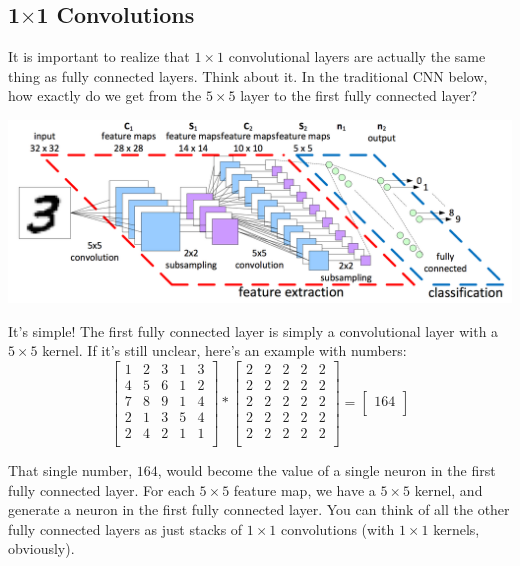 \documentclass{article}
\begin{document}
\subsection{1$\times$1 Convolutions}

It is important to realize that $1\times1$ convolutional layers are actually the same thing as fully connected layers. Think about it. In the traditional CNN below, how exactly do we get from the $5\times5$ layer to the first fully connected layer?

\begin{center}
\includegraphics[scale=0.45]{standardconv.png}
\end{center}

It's simple! The first fully connected layer is simply a convolutional layer with a $5\times5$ kernel. If it's still unclear, here's an example with numbers:
\[
\begin{bmatrix}
  1 & 2 & 3 & 1 & 3\\
  4 & 5 & 6 & 1 & 2\\
  7 & 8 & 9 & 1 & 4\\
  2 & 1 & 3 & 5 & 4\\
  2 & 4 & 2 & 1 & 1\\
\end{bmatrix}
*
\begin{bmatrix}
  2 & 2 & 2 & 2 & 2\\
  2 & 2 & 2 & 2 & 2\\
  2 & 2 & 2 & 2 & 2\\
  2 & 2 & 2 & 2 & 2\\
  2 & 2 & 2 & 2 & 2\\

\end{bmatrix}
=
\begin{bmatrix}
  164\\
\end{bmatrix}
\]


That single number, $164$, would become the value of a single neuron in the first fully connected layer. For each $5\times5$ feature map, we have a $5\times5$ kernel, and generate a neuron in the first fully connected layer. You can think of all the other fully connected layers as just stacks of $1\times1$ convolutions (with $1\times1$ kernels, obviously). 
\end{document}
